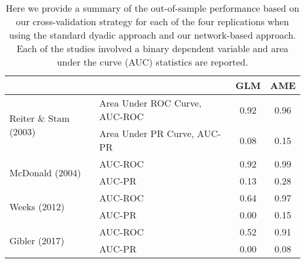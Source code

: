 \begin{table}[ht]
\centering
	\begin{tabular}{l|l cc}
	~ & ~ & GLM & AME \\
	\toprule
		\multirow{2}{*}{Reiter \& Stam (2003)} & Area Under ROC Curve, AUC-ROC & 0.92 & {0.96} \\
				~ & Area Under PR Curve, AUC-PR & 0.08 &  {0.15} \\		\midrule
		\multirow{2}{*}{McDonald (2004)} & AUC-ROC & 0.92 &  {0.99} \\
				~ & AUC-PR & 0.13 &  {0.28} \\		\midrule
		\multirow{2}{*}{Weeks (2012)} & AUC-ROC & 0.64 &  {0.97} \\
				~ & AUC-PR & 0.00 &  {0.15} \\		\midrule
		\multirow{2}{*}{Gibler (2017)} & AUC-ROC & 0.52 &  {0.91} \\
				~ & AUC-PR & 0.00 &  {0.08} \\			\bottomrule
	\end{tabular}
	\caption{Here we provide a summary of the out-of-sample performance based on our cross-validation strategy for each of the four replications when using the standard dyadic approach and our network-based approach. Each of the studies involved a binary dependent variable and area under the curve (AUC) statistics are reported.\tabularnewline
	}
	\label{tab:modelPerfSumm}
\end{table}
\FloatBarrier

